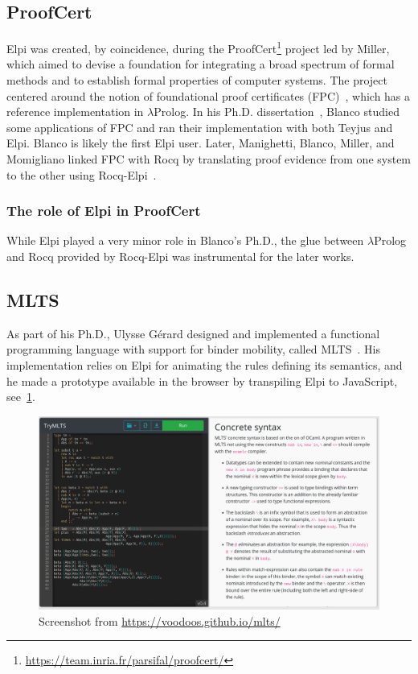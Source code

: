 \documentclass[a4paper, 11pt]{book}
\begin{document}
\subsection{ProofCert}

Elpi was created, by coincidence, during the
ProofCert\footnote{\url{https://team.inria.fr/parsifal/proofcert/}}
project led by Miller, which aimed to devise a foundation for integrating a
broad spectrum of formal methods and to establish formal properties of computer
systems. The project centered around the notion of foundational proof
certificates (FPC)~\cite{Marek_2016}, which has a reference implementation in
$\lambda$Prolog. In his Ph.D. dissertation~\cite{rob}, Blanco studied some
applications of FPC and ran their implementation with both Teyjus and Elpi.
Blanco is likely the first Elpi user. Later, Manighetti, Blanco, Miller, and
Momigliano linked FPC with Rocq by translating proof evidence from one system
to the other using Rocq-Elpi~\cite{matteo,alberto}.

\subsubsection{The role of Elpi in ProofCert}

While Elpi played a very minor role in Blanco's Ph.D., the glue between
$\lambda$Prolog and Rocq provided by Rocq-Elpi was instrumental for the later
works.

\subsection{MLTS}

As part of his Ph.D., Ulysse G\'{e}rard designed and implemented a
functional programming language with support for binder mobility, called MLTS~\cite{mlts}.
His implementation relies on Elpi for animating the rules defining its
semantics, and he made a prototype available in the browser by transpiling
Elpi to JavaScript, see~\cref{fig:mlts}.

\begin{figure}
    \includegraphics[width=.9\textwidth]{MLTS}
    \caption{Screenshot from \url{https://voodoos.github.io/mlts/}\label{fig:mlts}}
\end{figure}
\end{document}
